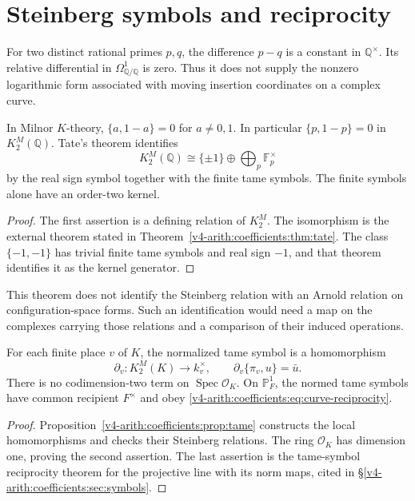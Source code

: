 \section{Steinberg symbols and reciprocity}
\label{v4-arith:bar:arnold-steinberg}

\begin{observation}
\label{v4-arith:obs:no-dlog-p-q}
For two distinct rational primes \(p,q\), the difference \(p-q\)
is a constant in \(\mathbb Q^\times\). Its relative differential
in \(\Omega^1_{\mathbb Q/\mathbb Q}\) is zero. Thus it does not
supply the nonzero logarithmic form associated with moving insertion
coordinates on a complex curve.
\end{observation}

\begin{theorem}
\label{v4-arith:thm:steinberg-replaces-arnold}
In Milnor \(K\)-theory, \(\{a,1-a\}=0\) for \(a\ne0,1\).
In particular \(\{p,1-p\}=0\) in \(K^M_2(\mathbb Q)\).
Tate's theorem identifies
\[
 K^M_2(\mathbb Q)\cong
 \{\pm1\}\oplus\bigoplus_p\mathbb F_p^\times
\]
by the real sign symbol together with the finite tame symbols.
The finite symbols alone have an order-two kernel.
\end{theorem}
\begin{proof}
The first assertion is a defining relation of \(K^M_2\).
The isomorphism is the external theorem stated in
Theorem~\ref{v4-arith:coefficients:thm:tate}. The class
\(\{-1,-1\}\) has trivial finite tame symbols and real sign
\(-1\), and that theorem identifies it as the kernel generator.
\end{proof}

This theorem does not identify the Steinberg relation with an Arnold
relation on configuration-space forms. Such an identification would
need a map on the complexes carrying those relations and a comparison
of their induced operations.

\begin{theorem}
\label{v4-arith:thm:parshin-reciprocity}
For each finite place \(v\) of \(K\), the normalized tame symbol
is a homomorphism
\[
 \partial_v:K^M_2(K)\longrightarrow k_v^\times,
 \qquad \partial_v\{\pi_v,u\}=\bar u.
\]
There is no codimension-two term on
\(\operatorname{Spec}\mathcal O_K\). On \(\mathbb P^1_F\), the
normed tame symbols have common recipient \(F^\times\) and obey
\eqref{v4-arith:coefficients:eq:curve-reciprocity}.
\end{theorem}
\begin{proof}
Proposition~\ref{v4-arith:coefficients:prop:tame} constructs the
local homomorphisms and checks their Steinberg relations.
The ring \(\mathcal O_K\) has dimension one, proving the second
assertion. The last assertion is the tame-symbol reciprocity theorem
for the projective line with its norm maps, cited in
\S\ref{v4-arith:coefficients:sec:symbols}.
\end{proof}

